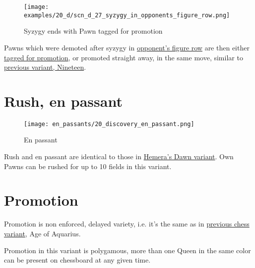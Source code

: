 \vspace*{-1.4\baselineskip}
\noindent
\begin{figure}[!h]
\texttt{[image: examples/20\_d/scn\_d\_27\_syzygy\_in\_opponents\_figure\_row.png]}
\caption{Syzygy ends with Pawn tagged for promotion}
\label{fig:scn_d_27_syzygy_in_opponents_figure_row}
\end{figure}

Pawns which were demoted after syzygy in
\hyperref[sec:Terms/Figure row]{opponent's figure row}
are then either \hyperref[sec:Age of Aquarius/Promotion]{tagged for promotion},
or promoted straight away, in the same move, similar to
\hyperref[fig:scn_n_11_teleport_pawns_init]{previous variant, Nineteen}.

\clearpage %

\section*{Rush, en passant}
\label{sec:Discovery/Rush, en passant}

\vspace*{-1.4\baselineskip}
\noindent
\begin{figure}[!h]
\texttt{[image: en\_passants/20\_discovery\_en\_passant.png]}
\caption{En passant}
\label{fig:20_discovery_en_passant}
\end{figure}

Rush and en passant are identical to those in \hyperref[fig:14_hemera_s_dawn_en_passant]{Hemera's Dawn variant}.
Own Pawns can be rushed for up to 10 fields in this variant.

\clearpage %

\section*{Promotion}
\label{sec:Discovery/Promotion}

Promotion is non enforced, delayed variety, i.e. it's the same as in
\hyperref[sec:Age of Aquarius/Promotion]{previous chess variant}, Age of Aquarius.

Promotion in this variant is polygamous, more than one Queen in the same color
can be present on chessboard at any given time.

